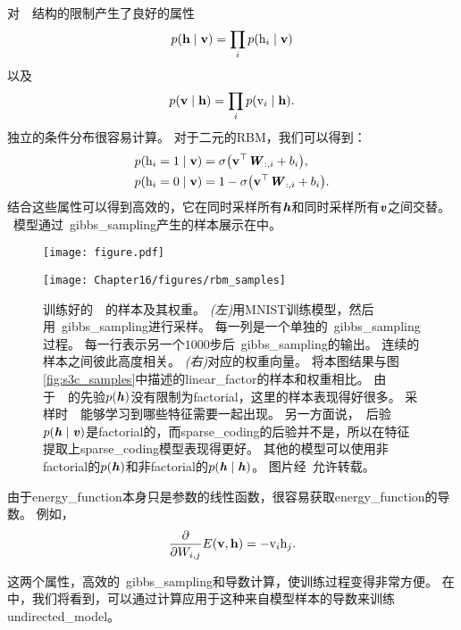 对~~结构的限制产生了良好的属性
\begin{align}
\label{eqn:1611}
p(\mathbf{h}\mid\mathbf{v}) = \prod_i p(\mathrm{h}_i\mid \mathbf{v})
\end{align}
以及
\begin{align}
\label{eqn:1612}
p(\mathbf{v}\mid\mathbf{h}) = \prod_i p(\mathrm{v}_i\mid \mathbf{h}).
\end{align}
独立的条件分布很容易计算。
对于二元的\gls{RBM}，我们可以得到：
\begin{align}
\label{eqn:1613}
p(\mathrm{h}_i = 1\mid\mathbf{v}) &= \sigma\big(\mathbf{v}^{\top}\boldsymbol{\mathit{W}}_{:,i} + b_i\big),\\
p(\mathrm{h}_i = 0\mid\mathbf{v}) &= 1 - \sigma\big(\mathbf{v}^{\top}\boldsymbol{\mathit{W}}_{:,i} + b_i\big).
\end{align}
结合这些属性可以得到高效的，它在同时采样所有$\boldsymbol{\mathit{h}}$和同时采样所有$\boldsymbol{\mathit{v}}$之间交替。
~模型通过~\gls{gibbs_sampling}产生的样本展示在中。

\begin{figure}[!htb]
\ifOpenSource
\centerline{\texttt{[image: figure.pdf]}}
\else
	\centerline{\texttt{[image: Chapter16/figures/rbm\_samples]}}	
\fi
\caption{训练好的~~的样本及其权重。
\emph{(左)}用MNIST训练模型，然后用~\gls{gibbs_sampling}进行采样。
每一列是一个单独的~\gls{gibbs_sampling}过程。
每一行表示另一个$1000$步后~\gls{gibbs_sampling}的输出。
连续的样本之间彼此高度相关。
\emph{(右)}对应的权重向量。
将本图结果与图\ref{fig:s3c_samples}中描述的\gls{linear_factor}的样本和权重相比。
由于~~的先验$p(\boldsymbol{\mathit{h}})$没有限制为\gls{factorial}，这里的样本表现得好很多。
采样时~~能够学习到哪些特征需要一起出现。
另一方面说，~后验$p(\boldsymbol{\mathit{h}} \mid \boldsymbol{\mathit{v}})$是\gls{factorial}的，而\gls{sparse_coding}的后验并不是，所以在特征提取上\gls{sparse_coding}模型表现得更好。
其他的模型可以使用非\gls{factorial}的$p(\boldsymbol{\mathit{h}})$和非\gls{factorial}的$p(\boldsymbol{\mathit{h}} \mid \boldsymbol{\mathit{h}})$。
图片经~\citet{lisa_tutorial_rbm}允许转载。}
\label{fig:rbm_sample}
\end{figure}


由于\gls{energy_function}本身只是参数的线性函数，很容易获取\gls{energy_function}的导数。 例如，
\begin{align}
\label{eqn:1615}
\frac{\partial}{\partial W_{i,j}} E(\mathbf{v},\mathbf{h}) = - \mathrm{v}_i \mathrm{h}_j.
\end{align}


这两个属性，高效的~\gls{gibbs_sampling}和导数计算，使训练过程变得非常方便。
在中，我们将看到，可以通过计算应用于这种来自模型样本的导数来训练\gls{undirected_model}。

